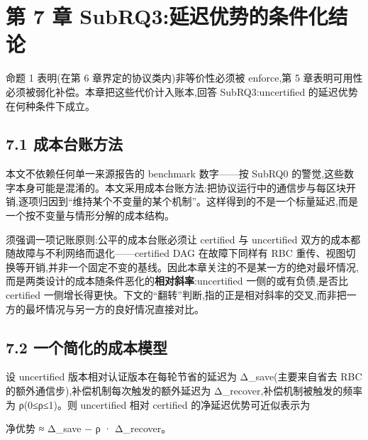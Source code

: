 \documentclass[UTF8,fontset=windows,a4paper,11pt]{ctexart}
\begin{document}
\section{第 7 章
SubRQ3:延迟优势的条件化结论}\label{ux7b2c-7-ux7ae0-subrq3ux5ef6ux8fdfux4f18ux52bfux7684ux6761ux4ef6ux5316ux7ed3ux8bba}

命题 1 表明(在第 6 章界定的协议类内)非等价性必须被 enforce,第 5
章表明可用性必须被弱化补偿。本章把这些代价计入账本,回答
SubRQ3:uncertified 的延迟优势在何种条件下成立。

\subsection{7.1
成本台账方法}\label{ux6210ux672cux53f0ux8d26ux65b9ux6cd5}

本文不依赖任何单一来源报告的 benchmark 数字------按 SubRQ0
的警觉,这些数字本身可能是混淆的。本文采用成本台账方法:把协议运行中的通信步与每区块开销,逐项归因到``维持某个不变量的某个机制''。这样得到的不是一个标量延迟,而是一个按不变量与情形分解的成本结构。

须强调一项记账原则:公平的成本台账必须让 certified 与 uncertified
双方的成本都随故障与不利网络而退化------certified DAG 在故障下同样有 RBC
重传、视图切换等开销,并非一个固定不变的基线。因此本章关注的不是某一方的绝对最坏情况,而是两类设计的成本随条件恶化的\textbf{相对斜率}:uncertified
一侧的或有负债,是否比 certified
一侧增长得更快。下文的``翻转''判断,指的正是相对斜率的交叉,而非把一方的最坏情况与另一方的良好情况直接对比。

\subsection{7.2
一个简化的成本模型}\label{ux4e00ux4e2aux7b80ux5316ux7684ux6210ux672cux6a21ux578b}

设 uncertified 版本相对认证版本在每轮节省的延迟为 Δ\_save(主要来自省去
RBC 的额外通信步),补偿机制每次触发的额外延迟为
Δ\_recover,补偿机制被触发的频率为 ρ(0≤ρ≤1)。则 uncertified 相对
certified 的净延迟优势可近似表示为

净优势 ≈ Δ\_save − ρ · Δ\_recover。
\end{document}
